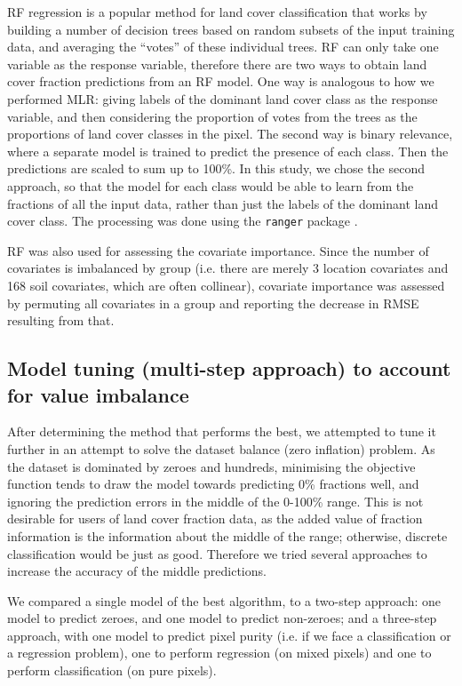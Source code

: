 \documentclass[a4paper,10pt]{article}
\begin{document}
\ac{RF} regression is a popular method for land cover classification that works by building a number of decision trees based on random subsets of the input training data, and averaging the ``votes'' of these individual trees.
\ac{RF} can only take one variable as the response variable, therefore there are two ways to obtain land cover fraction predictions from an \ac{RF} model.
One way is analogous to how we performed \ac{MLR}: giving labels of the dominant land cover class as the response variable, and then considering the proportion of votes from the trees as the proportions of land cover classes in the pixel.
The second way is binary relevance, where a separate model is trained to predict the presence of each class.
Then the predictions are scaled to sum up to 100\%.
In this study, we chose the second approach, so that the model for each class would be able to learn from the fractions of all the input data, rather than just the labels of the dominant land cover class.
The processing was done using the \texttt{ranger} package \citep{ranger}.

\ac{RF} was also used for assessing the covariate importance.
Since the number of covariates is imbalanced by group (i.e. there are merely 3 location covariates and 168 soil covariates, which are often collinear), covariate importance was assessed by permuting all covariates in a group and reporting the decrease in \ac{RMSE} resulting from that.

\subsection{Model tuning (multi-step approach) to account for value imbalance}
\label{sec-multistep}

After determining the method that performs the best, we attempted to tune it further in an attempt to solve the dataset balance (zero inflation) problem.
As the dataset is dominated by zeroes and hundreds, minimising the objective function tends to draw the model towards predicting 0\% fractions well, and ignoring the prediction errors in the middle of the 0-100\% range.
This is not desirable for users of land cover fraction data, as the added value of fraction information is the information about the middle of the range; otherwise, discrete classification would be just as good.
Therefore we tried several approaches to increase the accuracy of the middle predictions.

We compared a single model of the best algorithm, to a two-step approach: one model to predict zeroes, and one model to predict non-zeroes; and a three-step approach, with one model to predict pixel purity (i.e. if we face a classification or a regression problem), one to perform regression (on mixed pixels) and one to perform classification (on pure pixels).
\end{document}
